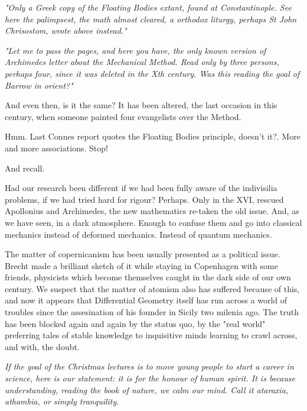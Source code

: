 \documentclass[a4paper,10pt]{article}
\begin{document}
{\it "Only a Greek copy of the Floating Bodies extant, found at Constantinople.
See here the palimpsest, the math almost cleared, a orthodox liturgy,
perhaps St John Chrisostom, wrote above instead."}

{\it "Let me to pass
the pages, and here you have, the only known version of Archimedes
letter about the Mechanical Method. Read only by three persons, perhaps
four, since it was deleted in the Xth century. Was this reading the
goal of Barrow in orient?"}

And even then, is it the same? It has been altered, the last occasion
in this century, when someone painted four evangelists over the Method. 

Hmm. Last Connes report \cite{rh1} quotes the Floating Bodies
principle, doesn't it?. More and more associations. Stop!

And recall.

Had our research been different if we had been fully aware of the
indivisilia problems, if we had tried hard for rigour? Perhaps. Only
in the XVI, rescued Apollonius and Archimedes, the new mathematics
re-taken the old issue. And, as we have seen, in a dark atmosphere.
Enough to confuse them and go into classical mechanics instead
of deformed mechanics. Instead of quantum mechanics.

The matter of copernicanism has been usually presented as a political
issue. Brecht made a brilliant sketch of it while staying in Copenhagen
with some friends, physicists which become themselves caught in the
dark side of our own century. We suspect that the matter of atomism
also has suffered because of this, and now it appears that
Differential Geometry
itself has run across a world of troubles since the assesination
of his founder in Sicily two milenia ago. The truth has been blocked
again and again by the status quo, by the "real world" preferring 
tales of stable knowledge to inquisitive minds learning
to crawl across, and with, the doubt.   



{\it If the goal of the Christmas lectures is to move young people to 
start a career in science, here is our statement: it is 
for the honour of human spirit. It is because understanding, reading the book
of nature, we calm our mind.
 Call it ataraxia, athambia, or simply tranquility.}
\end{document}
